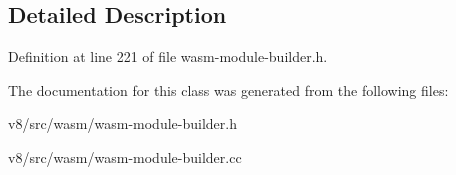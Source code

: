 \subsection{Detailed Description}


Definition at line 221 of file wasm-\/module-\/builder.\+h.



The documentation for this class was generated from the following files\+:\begin{DoxyCompactItemize}
\item 
v8/src/wasm/wasm-\/module-\/builder.\+h\item 
v8/src/wasm/wasm-\/module-\/builder.\+cc\end{DoxyCompactItemize}

